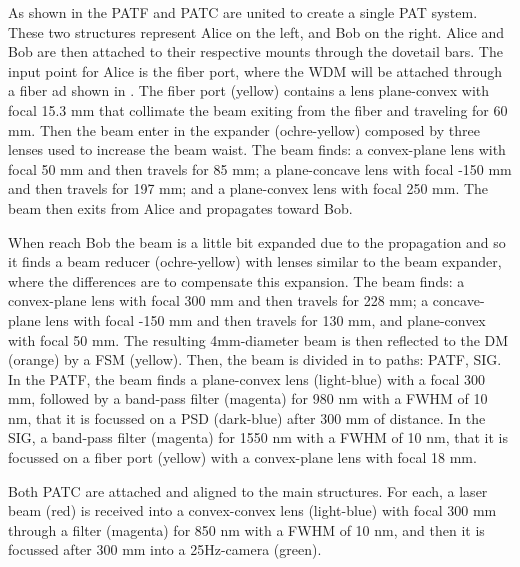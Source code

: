 
As shown in the  PATF and PATC are united to create a single PAT system. These two structures represent Alice on the left, and Bob on the right. Alice and Bob are then attached to their respective mounts through the dovetail bars.
The input point for Alice is the fiber port, where the WDM will be attached through a fiber ad shown in . The fiber port (yellow) contains a lens plane-convex with focal 15.3 mm that collimate the beam exiting from the fiber and traveling for 60 mm. Then the beam enter in the expander (ochre-yellow) composed by three lenses used to increase the beam waist. The beam finds: a convex-plane lens with focal 50 mm and then travels for 85 mm; a plane-concave lens with focal -150 mm and then travels for 197 mm; and a plane-convex lens with focal 250 mm. The beam then exits from Alice and propagates toward Bob.

When reach Bob the beam is a little bit expanded due to the propagation and so it finds a beam reducer (ochre-yellow) with lenses similar to the beam expander, where the differences are to compensate this expansion. The beam finds: a convex-plane lens with focal 300 mm and then travels for 228 mm; a concave-plane lens with focal -150 mm and then travels for 130 mm, and plane-convex with focal 50 mm. The resulting 4mm-diameter beam is then reflected to the DM (orange) by a FSM (yellow). Then, the beam is divided in to paths: PATF, SIG.
In the PATF, the beam finds a plane-convex lens (light-blue) with a focal 300 mm, followed by a band-pass filter (magenta) for 980 nm with a FWHM of 10 nm, that it is focussed on a PSD (dark-blue) after 300 mm of distance.
In the SIG, a band-pass filter (magenta) for 1550 nm with a FWHM of 10 nm, that it is focussed on a fiber port (yellow) with a convex-plane lens with focal 18 mm.

Both PATC are attached and aligned to the main structures. For each, a laser beam (red) is received into a convex-convex lens (light-blue) with focal 300 mm through a filter (magenta) for 850 nm with a FWHM of 10 nm, and then it is focussed after 300 mm into a 25Hz-camera (green).

